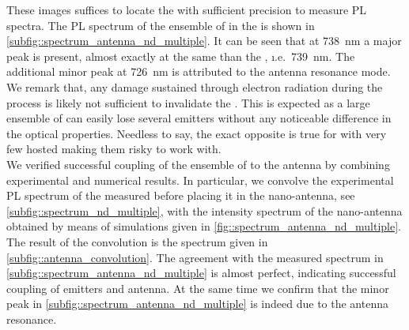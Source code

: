 			These images suffices to locate the \nd with sufficient precision to measure PL spectra.
			The PL spectrum of the ensemble of \sivs in the \nd is shown in \autoref{subfig::spectrum_antenna_nd_multiple}. It can be seen that at \SI{738}{\nm} a major peak is present, almost exactly at the same \wl than the \siv \zpl, \i.e.\ \SI{739}{\nm}. The additional minor peak at \SI{726}{\nm} is attributed to the antenna resonance mode. We remark that, any damage sustained through electron radiation during the \pp process is likely not sufficient to invalidate the \nd. This is expected as a large ensemble of \sivs can easily lose several emitters without any noticeable difference in the optical properties. Needless to say, the exact opposite is true for \nds with very few hosted \sivs making them risky to work with.
			\\
			We verified successful coupling of the ensemble of \sivs to the antenna by combining experimental and numerical results. In particular, we convolve the experimental PL spectrum of the \nd measured before placing it in the nano-antenna, see \autoref{subfig::spectrum_nd_multiple},  with the intensity spectrum of the nano-antenna obtained by means of simulations given in \autoref{fig::spectrum_antenna_nd_multiple}.
			The result of the convolution is the spectrum given in \autoref{subfig::antenna_convolution}. The agreement with the measured spectrum in \autoref{subfig::spectrum_antenna_nd_multiple} is almost perfect, indicating successful coupling of emitters and antenna. At the same time we confirm that the minor peak in \autoref{subfig::spectrum_antenna_nd_multiple} is indeed due to the antenna resonance.

